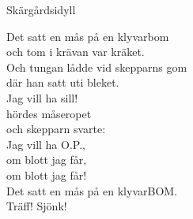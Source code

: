 \begin{song}{Skärgårdsidyll}
	
	
	
	
	Det satt en mås på en klyvarbom\\
	och tom i krävan var kräket.\\
	Och tungan lådde vid skepparns gom\\
	där han satt uti bleket.\\
	Jag vill ha sill!\\
	hördes måseropet\\
	och skepparn svarte:\\
	Jag vill ha O.P.,\\
	om blott jag får,\\
	om blott jag får!\\
	Det satt en mås på en klyvarBOM.\\
	Träff! Sjönk!
	
	
\end{song}
